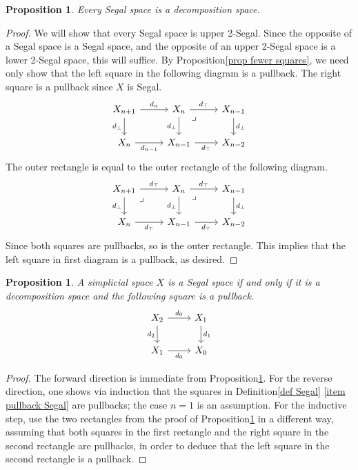 \documentclass{conm-p-l}
\newtheorem{proposition}[theorem]{Proposition}
\theoremstyle{definition}
\theoremstyle{remark}
\begin{document}
\begin{proposition}\label{segal implies decomposition}
Every Segal space is a decomposition space.
\end{proposition}
\begin{proof}
We will show that every Segal space is upper 2-Segal.
Since the opposite of a Segal space is a Segal space, and the opposite of an upper 2-Segal space is a lower 2-Segal space, this will suffice.
By Proposition\nobreakspace \ref {prop fewer squares}, we need only show that the left square in the following diagram is a pullback.
The right square is a pullback since $X$ is Segal.
\[ \begin{tikzcd}
X_{n+1} \rar{d_n} \dar[swap]{d_\bot} &
X_n \rar{d_\top} \dar[swap]{d_\bot} \ar[dr, phantom, "\lrcorner" very near start] & X_{n-1} \dar{d_\bot}
\\
X_n \rar[swap]{d_{n-1}} & 
X_{n-1} \rar[swap]{d_\top} & X_{n-2}
\end{tikzcd} \]
The outer rectangle is equal to the outer rectangle of the following diagram.
\[ \begin{tikzcd}
X_{n+1} \rar{d_\top} \dar[swap]{d_\bot} \ar[dr, phantom, "\lrcorner" very near start] &
X_n \rar{d_\top} \dar[swap]{d_\bot} \ar[dr, phantom, "\lrcorner" very near start] & X_{n-1} \dar{d_\bot}
\\
X_n \rar[swap]{d_\top} & 
X_{n-1} \rar[swap]{d_\top} & X_{n-2}
\end{tikzcd} \]
Since both squares are pullbacks, so is the outer rectangle.
This implies that the left square in first diagram is a pullback, as desired.
\end{proof}

\begin{proposition}
A simplicial space $X$ is a Segal space if and only if it is a decomposition space and the following square is a pullback.
\[ \begin{tikzcd}
X_2 \rar{d_0} \dar[swap]{d_2} & X_1 \dar{d_1} \\
X_1 \rar[swap]{d_0} & X_0
\end{tikzcd} \]
\end{proposition}
\begin{proof}
The forward direction is immediate from Proposition\nobreakspace \ref {segal implies decomposition}.
For the reverse direction, one shows via induction that the squares in Definition\nobreakspace \ref {def Segal} \eqref{item pullback Segal} are pullbacks; the case $n=1$ is an assumption.
For the inductive step, use the two rectangles from the proof of Proposition\nobreakspace \ref {segal implies decomposition} in a different way, assuming that both squares in the first rectangle and the right square in the second rectangle are pullbacks, in order to deduce that the left square in the second rectangle is a pullback.
\end{proof}
\end{document}
